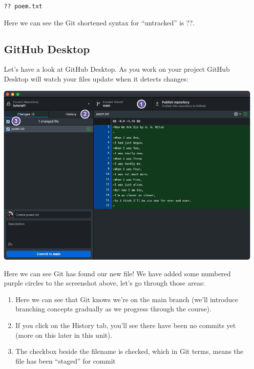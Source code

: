 \documentclass[
  letterpaper,
  DIV=11,
  numbers=noendperiod]{scrartcl}
\begin{document}
\begin{verbatim}
?? poem.txt
\end{verbatim}

Here we can see the Git shortened syntax for ``untracked'' is ??.

\subsection{GitHub Desktop}

Let's have a look at GitHub Desktop. As you work on your project GitHub
Desktop will watch your files update when it detects changes:

\includegraphics{images/image9.png}

Here we can see Git has found our new file! We have added some numbered
purple circles to the screenshot above, let's go through those areas:

\begin{enumerate}
\def\labelenumi{\arabic{enumi}.}
\item
  Here we can see that Git knows we're on the main branch (we'll
  introduce branching concepts gradually as we progress through the
  course).
\item
  If you click on the History tab, you'll see there have been no commits
  yet (more on this later in this unit).
\item
  The checkbox beside the filename is checked, which in Git terms, means
  the file has been ``staged'' for commit
\end{enumerate}
\end{document}
